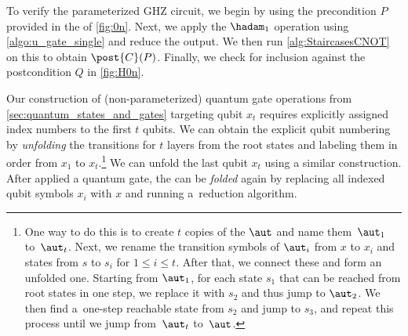 To verify the parameterized GHZ circuit, we begin by using the precondition $P$ provided in the \lsta of \cref{fig:0n}. Next, we apply the $\hadam_1$ operation using \cref{algo:u_gate_single} and reduce the output. We then run \cref{alg:StaircasesCNOT} on this \lsta to obtain $\post{C}(P)$. Finally, we check for inclusion against the postcondition $Q$ in \cref{fig:H0n}.


 Our construction of (non-parameterized)
\lsta quantum gate operations from \cref{sec:quantum_states_and_gates} targeting qubit $x_t$ requires explicitly assigned
index numbers to the first $t$ qubits. We can obtain the explicit qubit
numbering by \emph{unfolding} the transitions for $t$ layers from the root
states and labeling them in order from $x_1$ to $x_t$.\footnote{One way to do this is to
create $t$ copies of the \lsta $\aut$ and name them~$\aut_1$ to~$\aut_t$.
Next, we rename the transition symbols of $\aut_i$ from $x$ to $x_i$ and states
from $s$ to $s_i$ for $1 \leq i \leq t$. After that, we connect these \lstas and form an unfolded one.
Starting from $\aut_1$, for each state $s_1$ that can be reached from root
states in one step, we replace it with $s_2$ and thus jump to $\aut_2$. We then
find a~one-step reachable state from $s_2$ and jump to $s_3$, and repeat this
process until we jump from~$\aut_t$ to~$\aut$. } We can unfold the last qubit
$x_t$  using a similar construction.
After applied a quantum gate, the \lsta can be \emph{folded} again by replacing all indexed qubit symbols
$x_i$ with $x$ and running a~reduction algorithm. 


%

